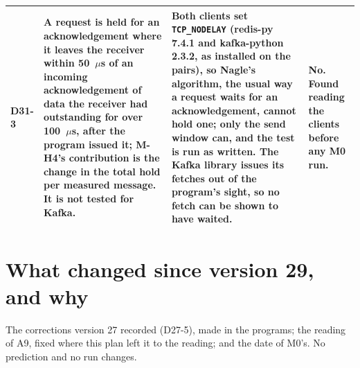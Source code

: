 \documentclass[11pt]{article}
\begin{document}
{\begin{longtable}{@{}p{1.1cm} >{\raggedright\arraybackslash}p{6.1cm} >{\raggedright\arraybackslash}p{6.0cm} >{\raggedright\arraybackslash}p{2.2cm}@{}}
D31-3 & A request is held for an acknowledgement where it leaves the receiver within 50~$\mu$s of an incoming acknowledgement of data the receiver had outstanding for over 100~$\mu$s, after the program issued it; M-H4's contribution is the change in the total hold per measured message. It is not tested for Kafka. & Both clients set \texttt{TCP\_NODELAY} (redis-py 7.4.1 and kafka-python 2.3.2, as installed on the pairs), so Nagle's algorithm, the usual way a request waits for an acknowledgement, cannot hold one; only the send window can, and the test is run as written. The Kafka library issues its fetches out of the program's sight, so no fetch can be shown to have waited. & No. Found reading the clients before any M0 run. \\
\bottomrule
\end{longtable}}

\section*{What changed since version 29, and why}
The corrections version 27 recorded (D27-5), made in the programs; the reading of A9, fixed
where this plan left it to the reading; and the date of M0's. No prediction and no run
changes.
\end{document}
